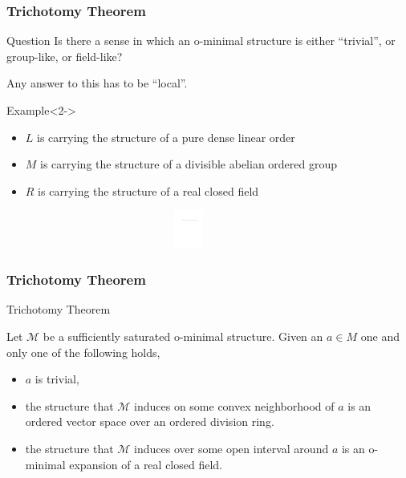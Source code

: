 \begin{frame}[t]\frametitle{Trichotomy Theorem}
    
	\begin{beamerboxesrounded}[shadow=true, upper=question]{Question}
		Is there a sense in which an o-minimal structure is either ``trivial'', or group-like, or field-like?
	\end{beamerboxesrounded}

	Any answer to this has to be ``local''.

	\begin{exampleblock}{Example}<2->

		\begin{itemize}
			\item $L$ is carrying the structure of a  pure dense linear order
			\item $M$ is carrying the structure of a  divisible abelian ordered group
			\item $R$ is carrying the structure of a  real closed field
		\end{itemize}

		\centering\includegraphics[height=1.25cm,width=12cm]{img/trichotomy--.pdf}\par

	\end{exampleblock}

\end{frame}

\begin{frame}[c]\frametitle{Trichotomy Theorem}
    
	\begin{beamerboxesrounded}[shadow=true]{Trichotomy Theorem \citep{peterzil1998trichotomy}}
		
		Let $\mathcal{M}$ be a sufficiently saturated o-minimal structure.
		Given an $a \in M$ one and only one of the following holds,

		\begin{itemize}
			\item $a$ is trivial,
			\item the structure that $\mathcal{M}$ induces on some convex neighborhood of $a$ is an ordered vector space over an ordered division ring.
			\item the structure that $\mathcal{M}$ induces over some open interval around $a$ is an o-minimal expansion of a real closed field.
		\end{itemize}

	\end{beamerboxesrounded}

\end{frame}